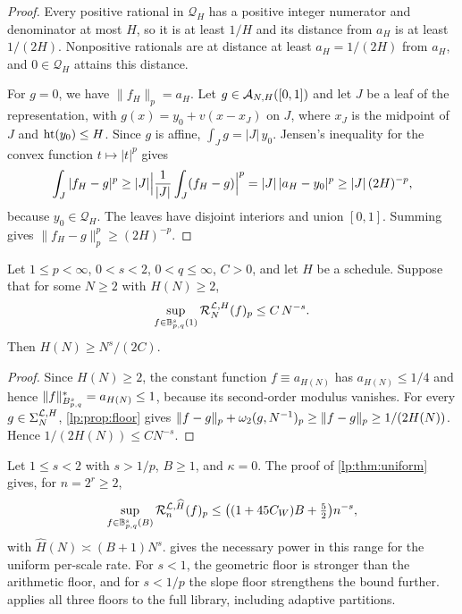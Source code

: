 \documentclass[11pt,a4paper]{article}
\begin{document}
\begin{proof}
Every positive rational in $\mathcal Q_H$ has a positive integer numerator and denominator at most $H$, so it is at least $1/H$ and its distance from $a_H$ is at least $1/(2H)$. Nonpositive rationals are at distance at least $a_H=1/(2H)$ from $a_H$, and $0\in\mathcal Q_H$ attains this distance.

For $g=0$, we have $\|f_H\|_p=a_H$. Let $g\in\mathcal A_{N,H}([0,1])$ and let $J$ be a leaf of the representation, with $g(x)=y_0+v(x-x_J)$ on $J$, where $x_J$ is the midpoint of $J$ and $\operatorname{ht}(y_0)\le H$. Since $g$ is affine, $\int_Jg=|J|\,y_0$. Jensen's inequality for the convex function $t\mapsto|t|^p$ gives
\[
 \int_J|f_H-g|^p\ge|J|\Bigl|\frac1{|J|}\int_J(f_H-g)\Bigr|^p=|J|\,|a_H-y_0|^p\ge|J|\,(2H)^{-p},
\]
because $y_0\in\mathcal Q_H$. The leaves have disjoint interiors and union $[0,1]$. Summing gives $\|f_H-g\|_p^p\ge(2H)^{-p}$.
\end{proof}

\begin{corolario}
\label{lp:cor:floor}
Let $1\le p<\infty$, $0<s<2$, $0<q\le\infty$, $C>0$, and let $H$ be a schedule. Suppose that for some $N\ge2$ with $H(N)\ge2$,
\[
 \sup_{f\in\mathbb B^s_{p,q}(1)}\mathcal R^{\mathcal L,H}_{N}(f)_p\le C\,N^{-s}.
\]
Then $H(N)\ge N^s/(2C)$.
\end{corolario}

\begin{proof}
Since $H(N)\ge2$, the constant function $f\equiv a_{H(N)}$ has $a_{H(N)}\le1/4$ and hence $\|f\|^*_{B^{s}_{p,q}}=a_{H(N)}\le1$, because its second-order modulus vanishes. For every $g\in\Sigma_{N}^{\mathcal L,H}$, \cref{lp:prop:floor} gives $\|f-g\|_p+\omega_2(g,N^{-1})_{p}\ge\|f-g\|_p\ge1/(2H(N))$. Hence $1/(2H(N))\le CN^{-s}$.
\end{proof}

\begin{observacao}
\label{lp:obs:floor}
Let $1\le s<2$ with $s>1/p$, $B\ge1$, and $\kappa=0$. The proof of \cref{lp:thm:uniform} gives, for $n=2^r\ge2$,
\[
 \sup_{f\in\mathbb B^s_{p,q}(B)}\mathcal R^{\mathcal L,\widehat H}_{n}(f)_p
 \le\bigl((1+45C_W)B+\tfrac52\bigr)n^{-s},
\]
with $\widehat H(N)\asymp(B+1)N^s$.  gives the necessary power in this range for the uniform per-scale rate. For $s<1$, the geometric floor is stronger than the arithmetic floor, and for $s<1/p$ the slope floor strengthens the bound further.  applies all three floors to the full library, including adaptive partitions.
\end{observacao}
\end{document}
